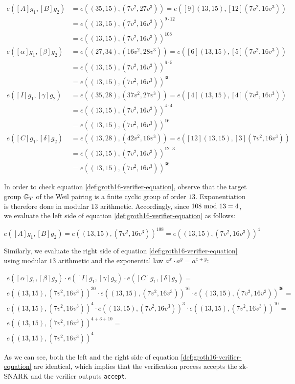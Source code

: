 \begin{example}
\begin{align*}
e([A]g_1,[B]g_2) & = e((35,15),(7v^2,27v^3))
                   = e([9](13,15),[12](7v^2,16v^3))\\
               & = e((13,15),(7v^2,16v^3))^{9\cdot 12}\\
               & = e((13,15),(7v^2,16v^3))^{108}\\
e([\alpha]g_1,[\beta]g_2) & = e((27,34),(16v^2,28v^3)) 
                            = e([6](13,15),[5](7v^2,16v^3))\\
               & = e((13,15),(7v^2,16v^3))^{6\cdot 5}\\
               & = e((13,15),(7v^2,16v^3))^{30}\\   
e([I]g_1,[\gamma]g_2) & = e((35,28),(37v^2,27v^3)) 
                            = e([4](13,15),[4](7v^2,16v^3))\\
               & = e((13,15),(7v^2,16v^3))^{4\cdot 4}\\
               & = e((13,15),(7v^2,16v^3))^{16}\\ 
e([C]g_1,[\delta]g_2) & = e((13,28),(42v^2,16v^3)) 
                            = e([12](13,15),[3](7v^2,16v^3))\\
               & = e((13,15),(7v^2,16v^3))^{12\cdot 3}\\
               & = e((13,15),(7v^2,16v^3))^{36}
\end{align*}  

In order to check equation \eqref{def:groth16-verifier-equation}, observe that the target group $\mathbb{G}_T$ of the Weil pairing is a finite cyclic group of order $13$. Exponentiation is therefore done in modular $13$ arithmetic. Accordingly, since $108 \text{ mod } 13=4$, we evaluate the left side of equation \eqref{def:groth16-verifier-equation} as follows:

$$
e([A]g_1,[B]g_2) = e((13,15),(7v^2,16v^3))^{108} =e((13,15),(7v^2,16v^3))^{4}
$$

Similarly, we evaluate the right side of equation \eqref{def:groth16-verifier-equation} using modular $13$ arithmetic and the exponential law $a^x\cdot a^y = a^{x+y}$:

\begin{align*}
e([\alpha]g_1,[\beta]g_2)\cdot e([I]g_1,[\gamma]g_2)\cdot e([C]g_1,[\delta]g_2) =\\
e((13,15),(7v^2,16v^3))^{30}\cdot e((13,15),(7v^2,16v^3))^{16}\cdot e((13,15),(7v^2,16v^3))^{36} =\\
e((13,15),(7v^2,16v^3))^{4}\cdot e((13,15),(7v^2,16v^3))^{3}\cdot e((13,15),(7v^2,16v^3))^{10} =\\
e((13,15),(7v^2,16v^3))^{4+3+10} = \\
e((13,15),(7v^2,16v^3))^{4}
\end{align*}

As we can see, both the left and the right side of equation \eqref{def:groth16-verifier-equation} are identical, which implies that the verification process accepts the zk-SNARK and the verifier outputs \texttt{accept}.
\end{example}

